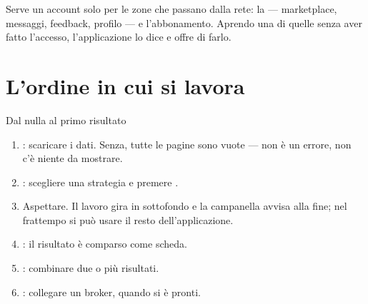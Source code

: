 Serve un account solo per le zone che passano dalla rete: la
 --- marketplace, messaggi, feedback, profilo --- e
l'abbonamento. Aprendo una di quelle senza aver fatto l'accesso,
l'applicazione lo dice e offre di farlo.

\section{L'ordine in cui si lavora}\label{sez:ordine}

\begin{pratica}{Dal nulla al primo risultato}
\begin{enumerate}
  \item {}: scaricare i dati. Senza, tutte le
        pagine sono vuote --- non è un errore, non c'è niente da mostrare.
  \item {}: scegliere una strategia e
        premere .
  \item Aspettare. Il lavoro gira in sottofondo e la campanella avvisa alla
        fine; nel frattempo si può usare il resto dell'applicazione.
  \item {}: il risultato è comparso come scheda.
  \item {}: combinare due o più risultati.
  \item {}: collegare un broker, quando si è pronti.
\end{enumerate}
\end{pratica}
